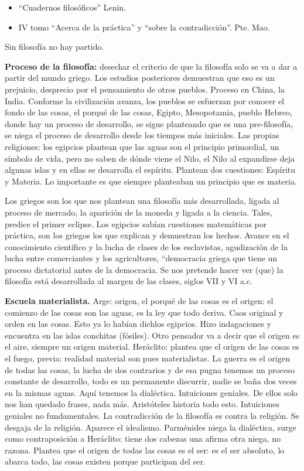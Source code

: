 \documentclass[
  a4paper,
]{article}
\providecommand{\tightlist}{%
  \setlength{\itemsep}{0pt}\setlength{\parskip}{0pt}}\usepackage{longtable,booktabs,array}
\begin{document}
\begin{itemize}
\tightlist
\item
  ``Cuadernos filosóficos'' Lenin.
\item
  IV tomo ``Acerca de la práctica'' y ``sobre la contradicción''. Pte.
  Mao.
\end{itemize}

Sin filosofía no hay partido.

\textbf{Proceso de la filosofía:} desechar el criterio de que la
filosofía solo se va a dar a partir del mundo griego. Los estudios
posteriores demuestran que eso es un prejuicio, desprecio por el
pensamiento de otros pueblos. Proceso en China, la India. Conforme la
civilización avanza, los pueblos se esfuerzan por conocer el fondo de
las cosas, el porqué de las cosas, Egipto, Mesopotamia, pueblo Hebreo,
donde hay un proceso de desarrollo, se sigue planteando que es una
pre-filosofía, se niega el proceso de desarrollo desde los tiempos más
iniciales. Las propias religiones: los egipcios plantean que las aguas
son el principio primordial, un símbolo de vida, pero no saben de dónde
viene el Nilo, el Nilo al expandirse deja algunas islas y en ellas se
desarrolla el espíritu. Plantean dos cuestiones: Espíritu y Materia. Lo
importante es que siempre planteaban un principio que es materia.

Los griegos son los que nos plantean una filosofía más desarrollada,
ligada al proceso de mercado, la aparición de la moneda y ligada a la
ciencia. Tales, predice el primer eclipse. Los egipcios sabían
cuestiones matemáticas por práctica, son los griegos los que explican y
demuestran los hechos. Avance en el conocimiento científico y la lucha
de clases de los esclavistas, agudización de la lucha entre comerciantes
y los agricultores, ``democracia griega que tiene un proceso dictatorial
antes de la democracia. Se nos pretende hacer ver (que) la filosofía
está desarrollada al margen de las clases, siglos VII y VI a.c.

\textbf{Escuela materialista.} Arge: origen, el porqué de las cosas es
el origen: el comienzo de las cosas son las aguas, es la ley que todo
deriva. Caos original y orden en las cosas. Esto ya lo habían dichlos
egipcios. Hizo indagaciones y encuentra en las islas conchitas
(fósiles). Otro pensador va a decir que el origen es el aire, siempre un
origen material. Heráclito: plantea que el origen de las cosas es el
fuego, previa: realidad material son pues materialistas. La guerra es el
origen de todas las cosas, la lucha de dos contrarios y de esa pugna
tenemos un proceso constante de desarrollo, todo es un permanente
discurrir, nadie se baña dos veces en la mismas aguas. Aquí tenemos la
dialéctica. Intuiciones geniales. De ellos solo nos han quedado frases,
nada más. Aristóteles historia todo esto. Intuiciones geniales no
fundamentales. La contradicción de la filosofía es contra la religión.
Se desgaja de la religión. Aparece el idealismo. Parménides niega la
dialéctica, surge como contraposición a Heráclito: tiene dos cabezas una
afirma otra niega, no razona. Plantea que el origen de todas las cosas
es el ser: es el ser absoluto, lo abarca todo, las cosas existen porque
participan del ser.
\end{document}
